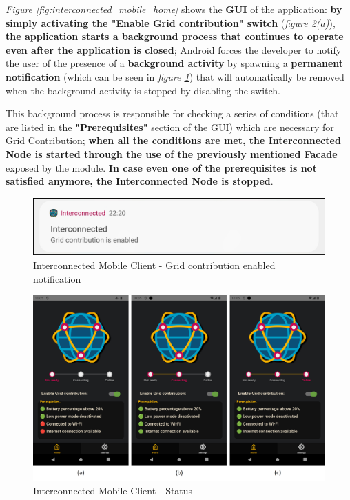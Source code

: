 \textit{Figure \ref{fig:interconnected_mobile_home}} shows the \textbf{GUI} of the application: \textbf{by simply activating the "Enable Grid contribution" switch} (\textit{figure \ref{fig:interconnected_mobile_connection}(a)}), \textbf{the application starts a background process that continues to operate even after the application is closed}; Android forces the developer to notify the user of the presence of a \textbf{background activity} by spawning a \textbf{permanent notification} (which can be seen in \textit{figure \ref{fig:notification_contribution}}) that will automatically be removed when the background activity is stopped by disabling the switch.

This background process is responsible for checking a series of conditions (that are listed in the \textbf{"Prerequisites"} section of the GUI) which are necessary for Grid Contribution; \textbf{when all the conditions are met, the Interconnected Node is started through the use of the previously mentioned Facade} exposed by the module. \textbf{In case even one of the prerequisites is not satisfied anymore, the Interconnected Node is stopped}.

\begin{figure}[!ht]
    \centering
    \includegraphics[scale=0.35]{document/chapters/chapter_6/images/notification_contribution.png}
    \caption{Interconnected Mobile Client - Grid contribution enabled notification}
    \label{fig:notification_contribution}
\end{figure}

\begin{figure}[!ht]
    \centering
    \includegraphics[width=\linewidth]{document/chapters/chapter_6/images/interconnected_mobile_connection.png}
    \caption{Interconnected Mobile Client - Status}
    \label{fig:interconnected_mobile_connection}
\end{figure}

